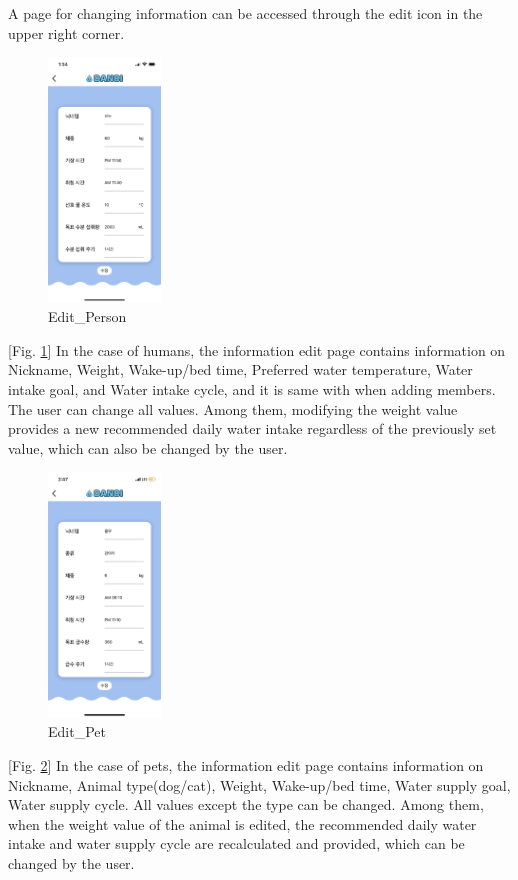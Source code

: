 \documentclass[conference]{IEEEtran}
\begin{document}
\begin{itemize}
\begin{enumerate}
A page for changing information can be accessed through the edit icon in the upper right corner.

\par \begin{figure}[h!]
\includegraphics[width=3cm]{page/editPerson.png}
\centering
\caption{Edit\_Person}
\label{fig:editPerson}
\end{figure}

[Fig. \ref{fig:editPerson}] In the case of humans, the information edit page contains information on Nickname, Weight, Wake-up/bed time, Preferred water temperature, Water intake goal, and Water intake cycle, and it is same with when adding members. The user can change all values. Among them, modifying the weight value provides a new recommended daily water intake regardless of the previously set value, which can also be changed by the user.

\par \begin{figure}[h!]
\includegraphics[width=3cm]{page/editPet.png}
\centering
\caption{Edit\_Pet}
\label{fig:editPet}
\end{figure}

[Fig. \ref{fig:editPet}] In the case of pets, the information edit page contains information on Nickname, Animal type(dog/cat), Weight, Wake-up/bed time, Water supply goal, Water supply cycle. All values except the type can be changed. Among them, when the weight value of the animal is edited, the recommended daily water intake and water supply cycle are recalculated and provided, which can be changed by the user.


\end{enumerate}
\end{itemize}
\end{document}
